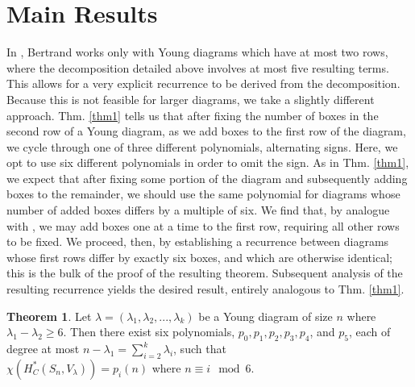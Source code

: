 \documentclass[12pt]{amsart}
\theoremstyle{definition}
\newtheorem{thm}{Theorem}
\begin{document}
\section{Main Results}
\label{res}

In \cite{B}, Bertrand works only with Young diagrams which have at most two rows, where the decomposition detailed above involves at most five resulting terms. This allows for  a very explicit recurrence to be derived from the decomposition. Because this is not feasible for larger diagrams, we take a slightly different approach. Thm. \ref{thm1} tells us that after fixing the number of boxes in the second row of a Young diagram, as we add boxes to the first row of the diagram, we cycle through one of three different polynomials, alternating signs. Here, we opt to use six different polynomials in order to omit the sign. As in Thm. \ref{thm1}, we expect that after fixing some portion of the diagram and subsequently adding boxes to the remainder, we should use the same polynomial for diagrams whose number of added boxes differs by a multiple of six. We find that, by analogue with \cite{B}, we may add boxes one at a time to the first row, requiring all other rows to be fixed. We proceed, then, by establishing a recurrence between diagrams whose first rows differ by exactly six boxes, and which are otherwise identical; this is the bulk of the proof of the resulting theorem. Subsequent analysis of the resulting recurrence yields the desired result, entirely analogous to Thm. \ref{thm1}.

\setcounter{thm}{1}

\begin{thm}
   Let $\lambda = (\lambda_1, \lambda_2, ..., \lambda_k)$ be a Young diagram of size $n$ where $\lambda_1 - \lambda_2 \geq 6$. Then there exist six polynomials, $p_0, p_1, p_2, p_3, p_4$, and $p_5$, each of degree at most $n - \lambda_1 = \sum_{i=2}^k \lambda_i$, such that \\ $\chi(H_C^*(S_n, V_{\lambda})) = p_i(n)$ where $n \equiv i \mod 6$.
\end{thm}
\end{document}
